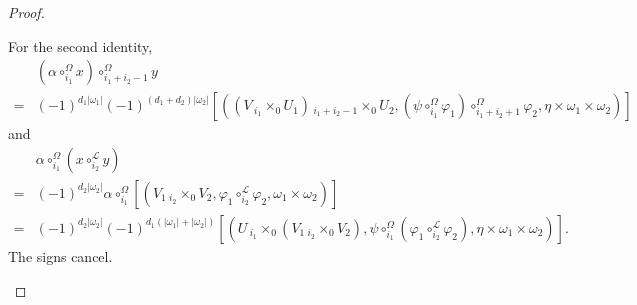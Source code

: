 \documentclass[10pt]{amsart}
\numberwithin{equation}{section}
\theoremstyle{plain}
\theoremstyle{definition}
\theoremstyle{remark}
\numberwithin{equation}{section}
\newcommand{\fiberprod}[2]{\,_{#1}\!\!\times_{#2} }
\begin{document}
{\begin{proof}
\begin{enumerate}
		
		For the second identity, 
		\begin{align*}
			&(\alpha \circ_{i_1}^\Omega x)\circ_{i_1+i_2-1}^\Omega y\\
			=& (-1)^{d_1|\omega_1|}(-1)^{(d_1+d_2)|\omega_2|}[((V\fiberprod{i_1}{0}U_1)\fiberprod{i_1+i_2-1}{0}U_2, (\psi \circ^\Omega_{i_1} \varphi_1)\circ_{i_1+i_2+1}^\Omega \varphi_2, \eta\times \omega_1\times \omega_2)]
		\end{align*}
		and 
		\begin{align*}
			&\alpha\circ_{i_1}^\Omega(x\circ_{i_2}^\mathscr{L} y) \\
			=& (-1)^{d_2|\omega_2|} \alpha\circ_{i_1}^\Omega [( V_1\fiberprod{i_2}{0}V_2, \varphi_1\circ_{i_2}^\mathscr{L} \varphi_2, \omega_1\times \omega_2 )]\\
			=& (-1)^{d_2|\omega_2|}(-1)^{d_1(|\omega_1|+|\omega_2|)}[(U\fiberprod{i_1}{0}(V_1\fiberprod{i_2}{0}V_2), \psi\circ_{i_1}^\Omega (\varphi_1\circ_{i_2}^\mathscr{L} \varphi_2),\eta\times \omega_1\times \omega_2)].
		\end{align*}
		The signs cancel.
		

\end{enumerate}
\end{proof}}
\end{document}
